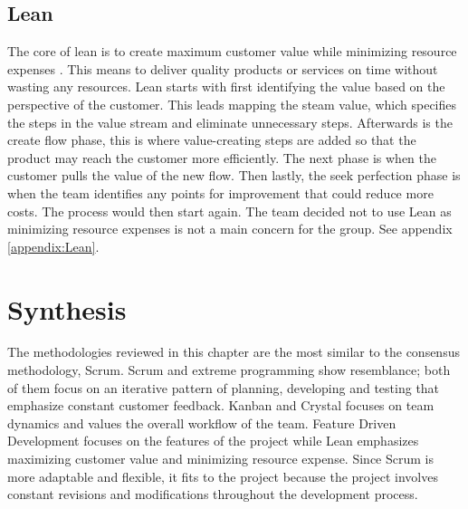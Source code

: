 \subsection{Lean}
The core of lean is to create maximum customer value while minimizing resource expenses \cite{ref:Lean}.  This means to deliver quality products or services on time without wasting any resources. Lean starts with first identifying the value based on the perspective of the customer. This leads mapping the steam value, which specifies the steps in the value stream and eliminate unnecessary steps. Afterwards is the create flow phase, this is where value-creating steps are added so that the product may reach the customer more efficiently. The next phase is when the customer pulls the value of the new flow. Then lastly, the seek perfection phase is when the team identifies any points for improvement that could reduce more costs. The process would then start again. The team decided not to use Lean as minimizing resource expenses is not a main concern for the group. See appendix \ref{appendix:Lean}. 

\section{Synthesis}
The methodologies reviewed in this chapter are the most similar to the consensus methodology, Scrum. Scrum and extreme programming show resemblance; both of them focus on an iterative pattern of planning, developing and testing that emphasize constant customer feedback. Kanban and Crystal  focuses on team dynamics and values the overall workflow of the team. Feature Driven Development focuses on the features of the project while Lean emphasizes maximizing customer value and minimizing resource expense. Since Scrum is more adaptable and flexible, it fits to the project because the project involves constant revisions and modifications throughout the development process. 